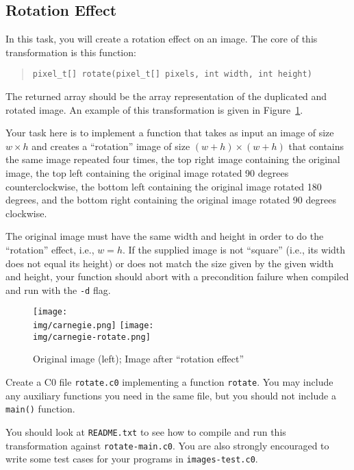 \subsection{Rotation Effect}
\label{sect:rotate}

In this task, you will create a rotation effect on an image.  The
core of this transformation is this function:
\begin{quote}
\begin{lstlisting}
pixel_t[] rotate(pixel_t[] pixels, int width, int height)
\end{lstlisting}
\end{quote}
The returned array should be the array representation of the
duplicated and rotated image.  An example of this transformation is given in
Figure~\ref{fig:carnegie-rotate}.

Your task here is to implement a function that takes as input an image
of size $w \times h$ and creates a ``rotation'' image of size $(w+h)
\times (w+h)$ that contains the same image repeated four times, the top
right image containing the original image, the top left containing the
original image rotated 90 degrees counterclockwise, the bottom left
containing the original image rotated 180 degrees, and the bottom
right containing the original image rotated 90 degrees clockwise.

The original image must have the same width and height in order to do the
``rotation'' effect, i.e., $w=h$. If the supplied image is not ``square''
(i.e., its width does not equal its height) or does not match the size given
by the given width and height, your function should abort with a precondition
failure when compiled and run with the \lstinline'-d' flag.

\begin{figure}
\centering
\texttt{[image: \\img/carnegie.png]}
\quad\quad
\texttt{[image: \\img/carnegie-rotate.png]}
\caption{Original image (left); Image after ``rotation effect''}
\label{fig:carnegie-rotate}
\end{figure}

\begin{task}[8]
  Create a C0 file \lstinline'rotate.c0' implementing a function
  \lstinline'rotate'.  You may include any auxiliary functions you
  need in the same file, but you should not include a
  \lstinline'main()' function.
\end{task}

You should look at \lstinline'README.txt' to see how to compile and run
this transformation against \lstinline'rotate-main.c0'.  You are also
strongly encouraged to write some test cases for your
programs in \lstinline'images-test.c0'.




